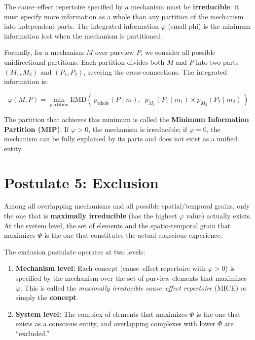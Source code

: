 \documentclass[11pt,a4paper]{report}
\newcommand{\Phi}{\varPhi}
\newcommand{\EMD}{\mathrm{EMD}}
\begin{document}
\begin{postulatebox}
The cause--effect repertoire specified by a mechanism must be \textbf{irreducible}: it must specify more information as a whole than any partition of the mechanism into independent parts. The integrated information $\varphi$ (small phi) is the minimum information lost when the mechanism is partitioned.
\end{postulatebox}

Formally, for a mechanism $M$ over purview $P$, we consider all possible unidirectional partitions. Each partition divides both $M$ and $P$ into two parts $(M_1, M_2)$ and $(P_1, P_2)$, severing the cross-connections. The integrated information is:

\begin{mathbox}
\vspace{-8pt}
\[
  \varphi(M, P) = \min_{\text{partition}} \EMD\!\left(\, p_{\text{whole}}(P \mid m),\;\; p_{M_1}(P_1 \mid m_1) \times p_{M_2}(P_2 \mid m_2)\,\right)
\]
\vspace{-10pt}
\end{mathbox}

The partition that achieves this minimum is called the \textbf{Minimum Information Partition (MIP)}. If $\varphi > 0$, the mechanism is irreducible; if $\varphi = 0$, the mechanism can be fully explained by its parts and does not exist as a unified entity.

\section{Postulate 5: Exclusion}

\begin{postulatebox}
Among all overlapping mechanisms and all possible spatial/temporal grains, only the one that is \textbf{maximally irreducible} (has the highest $\varphi$ value) actually exists. At the system level, the set of elements and the spatio-temporal grain that maximizes $\Phi$ is the one that constitutes the actual conscious experience.
\end{postulatebox}

The exclusion postulate operates at two levels:
\begin{enumerate}[leftmargin=2em]
  \item \textbf{Mechanism level:} Each concept (cause--effect repertoire with $\varphi > 0$) is specified by the mechanism over the set of purview elements that maximizes $\varphi$. This is called the \emph{maximally irreducible cause--effect repertoire} (MICE) or simply the \textbf{concept}.
  \item \textbf{System level:} The complex of elements that maximizes $\Phi$ is the one that exists as a conscious entity, and overlapping complexes with lower $\Phi$ are ``excluded.''
\end{enumerate}
\end{document}

